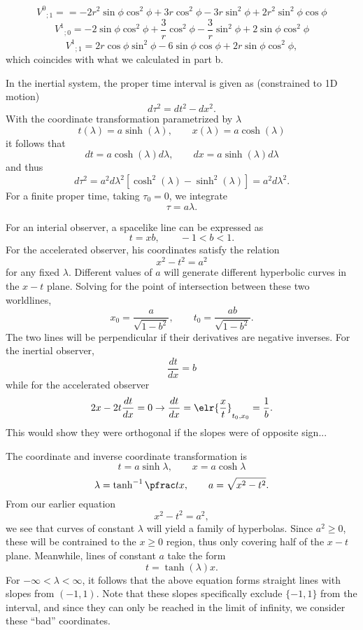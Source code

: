 \documentclass[10pt,letterpaper]{article}
\begin{document}
\[
	V^0{}_{;1} = =-2r^2\sin\phi\cos^2\phi + 3r\cos^2\phi -3r\sin^2\phi +2r^2\sin^2\phi\cos\phi
\]
\[
	V^1{}_{;0}=-2\sin\phi\cos^2\phi + \frac3r\cos^2\phi -\frac3r\sin^2\phi +2\sin\phi\cos^2\phi
\]
\[
	V^1{}_{;1}=2r\cos\phi\sin^2\phi - 6\sin\phi\cos\phi +2r\sin\phi\cos^2\phi,
\]
which coincides with what we calculated in part b.
\eenum
\item
\benum
\item
In the inertial system, the proper time interval is given as (constrained to 1D motion)
\[
	d\tau^2 = dt^2 - dx^2.
\]
With the coordinate transformation parametrized by $\lambda$
\[
	t(\lambda) = a \sinh(\lambda),\qquad x(\lambda)= a\cosh(\lambda)
\]
it follows that
\[
	dt = a\cosh (\lambda) d\lambda,\qquad dx = a\sinh(\lambda) d\lambda
\]
and thus
\[
	d\tau^2 = a^2 d\lambda^2 [\cosh^2(\lambda) - \sinh^2(\lambda)] = a^2 d\lambda^2.
\]
For a finite proper time, taking $\tau_0 = 0$, we integrate
\[
	\tau = a\lambda.
\]
\item
For an interial observer, a spacelike line can be expressed as
\[
	t = xb,\qquad -1<b<1.
\]
For the accelerated observer, his coordinates satisfy the relation
\[
	x^2 - t^2 = a^2
\]
for any fixed $\lambda$. Different values of $a$ will generate different hyperbolic curves in the $x-t$ plane. Solving for the point of intersection between these two worldlines,
\[
	x_0 = \frac{a}{\sqrt{1-b^2}},\qquad  t_0 = \frac{ab}{\sqrt{1-b^2}}.
\]
The two lines will be perpendicular if their derivatives are negative inverses. For the inertial observer,
\[
	\frac{dt}{dx} = b
\]
while for the accelerated observer
\[
	2x - 2t \frac{dt}{dx} = 0 \to \frac{dt}{dx} = \elr{\frac{x}{t}}_{t_0,x_0} = \frac1b.
\]
This would show they were orthogonal if the slopes were of opposite sign... \\
\item
The coordinate and inverse coordinate transformation is
\[
	t = a\sinh \lambda,\qquad x= a\cosh \lambda
\]
\[
	\lambda = \tanh^{-1}\pfrac tx,\qquad a =\sqrt{x^2-t^2}.
\]
From our earlier equation 
\[
	x^2 -t^2 = a^2,
\]
we see that curves of constant $\lambda$ will yield a family of hyperbolas. Since $a^2 \ge 0$, these will be contrained to the $x\ge 0$ region, thus only covering half of the $x-t$ plane. Meanwhile, lines of constant $a$ take the form
\[
	t = \tanh(\lambda) x.
\]
For $-\infty < \lambda < \infty$, it follows that the above equation forms straight lines with slopes from $(-1,1)$. Note that these slopes specifically exclude $\{-1,1\}$ from the interval, and since they can only be reached in the limit of infinity, we consider these ``bad'' coordinates.
\end{document}
